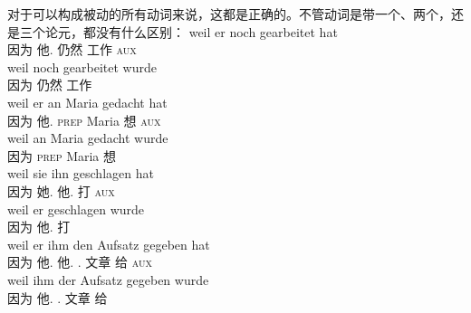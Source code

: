 \noindent
对于可以构成被动的所有动词来说，这都是正确的。不管动词是带一个、两个，还是三个论元，都没有什么区别：
\eal
\label{beispiel-arbeiten}
\ex 
\gll weil er noch gearbeitet hat\\
	 因为 他.\nom{} 仍然 工作 \textsc{aux}\\
\ex 
\gll weil noch gearbeitet wurde\\
	 因为 仍然 工作 \passivepst\\
\zl
\eal
\label{beispiel-denken}
\ex 
\gll weil er an Maria gedacht hat\\
	 因为 他.\nom{} \textsc{prep} Maria 想 \textsc{aux}\\
\ex 
\gll weil an Maria gedacht wurde\\
	 因为 \textsc{prep} Maria 想 \passivepst\\
\zl
\eal
\ex 
\gll weil sie ihn geschlagen hat\\
	 因为 她.\nom{} 他.\acc{} 打 \textsc{aux}\\
\ex 
\gll weil er geschlagen wurde\\
	 因为 他.\nom{} 打 \passivepst\\
\zl
\eal
\ex 
\gll weil er ihm den Aufsatz gegeben hat\\
      因为 他.\nom{} 他.\dat{} .\acc{} 文章 给 \textsc{aux}\\
\ex 
\gll weil ihm der Aufsatz gegeben wurde\\
     因为 他.\dat{} .\nom{} 文章 给 \passivepst\\
\zl

